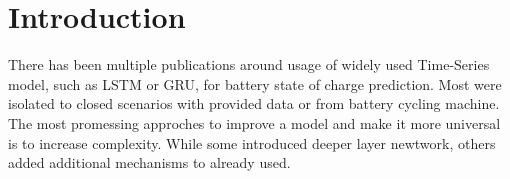 \section{Introduction} \label{sec:Introduction}
There has been multiple publications around usage of widely used Time-Series model, such as LSTM or GRU, for battery state of charge prediction.
Most were isolated to closed scenarios with provided data or from battery cycling machine.
The most promessing approches to improve a model and make it more universal is to increase complexity. While some introduced deeper layer newtwork, others added additional mechanisms to already used.